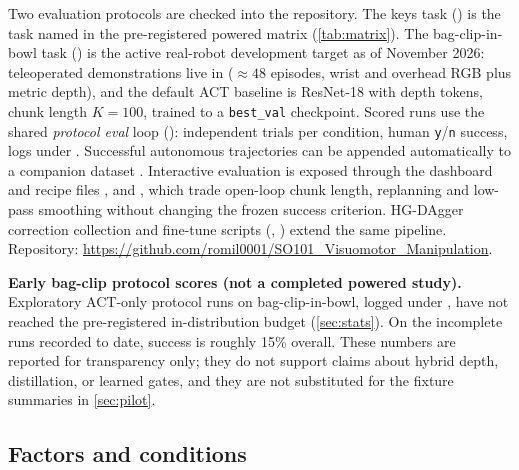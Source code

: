 \documentclass[11pt,a4paper]{article}
\theoremstyle{definition}
\begin{document}
Two evaluation protocols are checked into the repository. The keys task () is the task named in the pre-registered powered matrix (\cref{tab:matrix}). The bag-clip-in-bowl task () is the active real-robot development target as of November 2026: teleoperated demonstrations live in  (${\approx}48$ episodes, wrist and overhead RGB plus metric depth), and the default ACT baseline is ResNet-18 with depth tokens, chunk length $K=100$, trained to a \texttt{best\_val} checkpoint. Scored runs use the shared \emph{protocol eval} loop (): independent trials per condition, human \texttt{y}/\texttt{n} success, logs under . Successful autonomous trajectories can be appended automatically to a companion dataset . Interactive evaluation is exposed through the dashboard and recipe files ,  and , which trade open-loop chunk length, replanning and low-pass smoothing without changing the frozen success criterion. HG-DAgger correction collection and fine-tune scripts (, ) extend the same pipeline. Repository: \url{https://github.com/romil0001/SO101_Visuomotor_Manipulation}.

\textbf{Early bag-clip protocol scores (not a completed powered study).} Exploratory ACT-only protocol runs on bag-clip-in-bowl, logged under , have not reached the pre-registered in-distribution budget (\cref{sec:stats}). On the incomplete runs recorded to date, success is roughly 15\% overall. These numbers are reported for transparency only; they do not support claims about hybrid depth, distillation, or learned gates, and they are not substituted for the fixture summaries in \cref{sec:pilot}.

\subsection{Factors and conditions}
\end{document}
